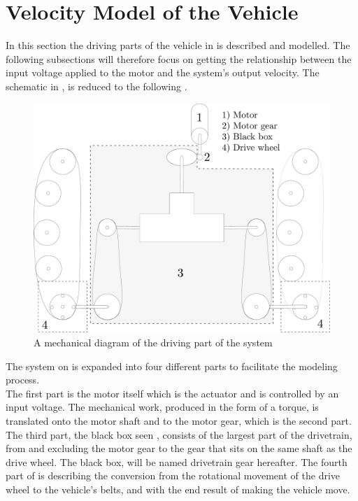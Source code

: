 \section{Velocity Model of the Vehicle}
In this section the driving parts of the vehicle in  is described and modelled. The following subsections will therefore focus on getting the relationship between the input voltage applied to the motor and the system's output velocity. The schematic in ,  is reduced to the following .

\begin{figure}[H]
	\centering
	\includegraphics[scale=0.2]{figures/vehicleDescriptionDriveTrainBlackBox.pdf}
	\caption{A mechanical diagram of the driving part of the system}
	\label{fig:vehicleDescriptionDriveTrainBlackBox}
\end{figure}

The system on  is expanded into four different parts to facilitate the modeling process.\\
The first part is the motor itself which is the actuator and is controlled by an input voltage. The mechanical work, produced in the form of a torque, is translated onto the motor shaft and to the motor gear, which is the second part.
The third part, the black box seen , consists of the largest part of the drivetrain, from and excluding the motor gear to the gear that sits on the same shaft as the drive wheel. The black box, will be named drivetrain gear hereafter.
The fourth part of  is describing the conversion from the rotational movement of the drive wheel to the vehicle's belts, and with the end result of making the vehicle move.

